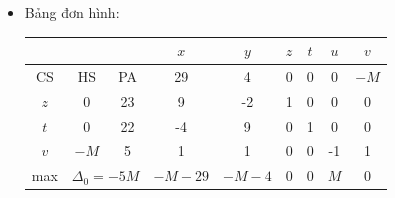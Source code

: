 \documentclass[12pt,a4paper]{article}
\begin{document}
			\begin{itemize}
				\item Bảng đơn hình:
					\begin{table}[H]
						\centering
						\setlength{\tabcolsep}{1.2em}
						{\renewcommand{\arraystretch}{1.5}\begin{tabular}{|ccc|c|c|c|c|c|c|}
						\hline
						\multicolumn{3}{|c|}{}                                                                                                          & \cellcolor[HTML]{B4C6E7}$x$   & \cellcolor[HTML]{B4C6E7}$y$ & \cellcolor[HTML]{B4C6E7}$z$ & \cellcolor[HTML]{B4C6E7}$t$ & \cellcolor[HTML]{B4C6E7}$u$ & \cellcolor[HTML]{B4C6E7}$v$ \\ \hline
						\multicolumn{1}{|c|}{\cellcolor[HTML]{B4C6E7}CS} & \multicolumn{1}{c|}{\cellcolor[HTML]{B4C6E7}HS} & \cellcolor[HTML]{B4C6E7}PA & 29                            & 4                           & 0                           & 0                           & 0                           & $-M$                          \\ \hline
						\multicolumn{1}{|c|}{$z$}                        & \multicolumn{1}{c|}{0}                          & 23                         & \cellcolor[HTML]{F4B084}9     & -2                          & 1                           & 0                           & 0                           & 0                           \\ \hline
						\multicolumn{1}{|c|}{$t$}                        & \multicolumn{1}{c|}{0}                          & 22                         & -4                            & 9                           & 0                           & 1                           & 0                           & 0                           \\ \hline
						\multicolumn{1}{|c|}{$v$}                        & \multicolumn{1}{c|}{$-M$}                         & 5                          & 1                             & 1                           & 0                           & 0                           & -1                          & 1                           \\ \hline
						\multicolumn{1}{|c|}{max}                        & \multicolumn{2}{c|}{$\Delta_0 = -5M$}                                        & \cellcolor[HTML]{F4B084}$-M-29$ & $-M-4$                        & 0                           & 0                           & $M$                           & 0                           \\ \hline
						\end{tabular}}

\end{table}
\end{itemize}
\end{document}
